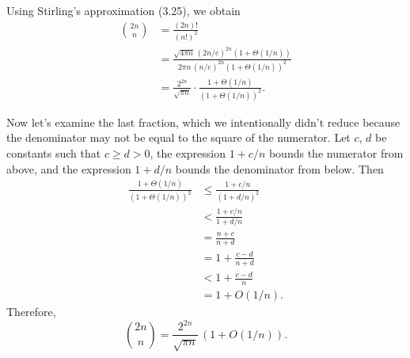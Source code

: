 Using Stirling's approximation (3.25), we obtain
\begin{align*}
    \binom{2n}{n} &= \frac{(2n)!}{(n!)^2} \\
    &= \frac{\sqrt{4\pi n}\,(2n/e)^{2n}(1+\Theta(1/n))}{2\pi n\,(n/e)^{2n}(1+\Theta(1/n))^2} \\[1mm]
    &= \frac{2^{2n}}{\sqrt{\pi n}}\cdot\frac{1+\Theta(1/n)}{(1+\Theta(1/n))^2}.
\end{align*}

Now let's examine the last fraction, which we intentionally didn't reduce because the denominator may not be equal to the square of the numerator.
Let $c$, $d$ be constants such that $c\ge d>0$, the expression $1+c/n$ bounds the numerator from above, and the expression $1+d/n$ bounds the denominator from below.
Then
\begin{align*}
    \frac{1+\Theta(1/n)}{(1+\Theta(1/n))^2} &\le \frac{1+c/n}{(1+d/n)^2} \\[1mm]
    &< \frac{1+c/n}{1+d/n} \\[1mm]
    &= \frac{n+c}{n+d} \\
    &= 1+\frac{c-d}{n+d} \\[1mm]
    &< 1+\frac{c-d}{n} \\[1mm]
    &= 1+O(1/n).
\end{align*}
Therefore,
\[
    \binom{2n}{n} = \frac{2^{2n}}{\sqrt{\pi n}}\,(1+O(1/n)).
\]
